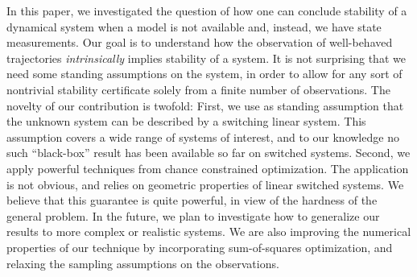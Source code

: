 In this paper, we investigated the question of how one can conclude stability of a dynamical system when a model is not available and, instead, we have state measurements. Our goal is to understand how the observation of well-behaved trajectories \emph{intrinsically} implies stability of a system. It is not surprising that we need some standing assumptions on the system, in order to allow for any sort of nontrivial stability certificate solely from a finite number of observations. The novelty of our contribution is twofold: First, we use as standing assumption that the unknown system can be described by a switching linear system. This assumption covers a wide range of systems of interest, and to our knowledge no such ``black-box'' result has been available so far on switched systems.  
Second, we apply powerful techniques from chance constrained optimization. The application is not obvious, and relies on geometric properties of linear switched systems. We believe that this guarantee is quite powerful, in view of the hardness of the general problem. In the future, we plan to investigate how to generalize our results to more complex or realistic systems. We are also improving the numerical properties of our technique by incorporating sum-of-squares optimization, and relaxing the sampling assumptions on the observations.
